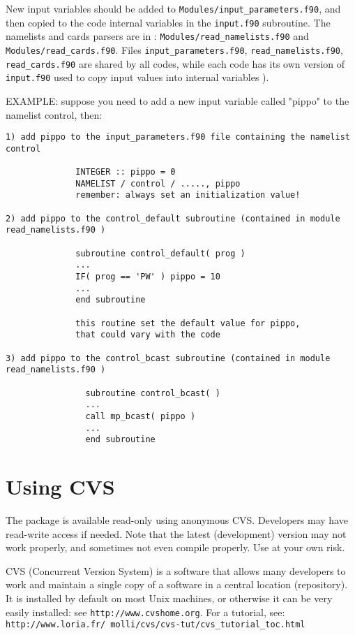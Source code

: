 \documentclass[12pt,a4paper]{article}
\begin{document}
New input variables should be added to \texttt{Modules/input\_parameters.f90}, 
and then copied to the code internal variables in the \texttt{input.f90}
subroutine. The namelists and cards parsers are in :
\texttt{Modules/read\_namelists.f90} and \texttt{Modules/read\_cards.f90}.
Files \texttt{input\_parameters.f90}, \texttt{read\_namelists.f90},
\texttt{read\_cards.f90} are shared by all codes, while each code 
has its own version of \texttt{input.f90}  used to copy input values 
into internal variables ).

EXAMPLE:
suppose you need to add a new input variable called "pippo"
to the namelist control, then:

\begin{verbatim}
1) add pippo to the input_parameters.f90 file containing the namelist
control

              INTEGER :: pippo = 0
              NAMELIST / control / ....., pippo
              remember: always set an initialization value!

2) add pippo to the control_default subroutine (contained in module
read_namelists.f90 )

              subroutine control_default( prog )
              ...
              IF( prog == 'PW' ) pippo = 10
              ...
              end subroutine

              this routine set the default value for pippo,
              that could vary with the code

3) add pippo to the control_bcast subroutine (contained in module 
read_namelists.f90 )

                subroutine control_bcast( )
                ...
                call mp_bcast( pippo )
                ...
                end subroutine
\end{verbatim}

\section{Using CVS}

\label{cvs}
The package is available read-only using anonymous CVS. Developers 
may have read-write access if needed. Note that the latest
(development) version may not work properly, and sometimes not 
even compile properly. Use at your own risk.

CVS (Concurrent Version System) is a software that allows many
developers to work and maintain a single copy of a software in
a central location (repository). It is installed by default on
most Unix machines, or otherwise it can be very easily installed:
see {\tt http://www.cvshome.org}. For a tutorial, see:\\
{\tt http://www.loria.fr/~{}molli/cvs/cvs-tut/cvs\_tutorial\_toc.html}
\end{document}
